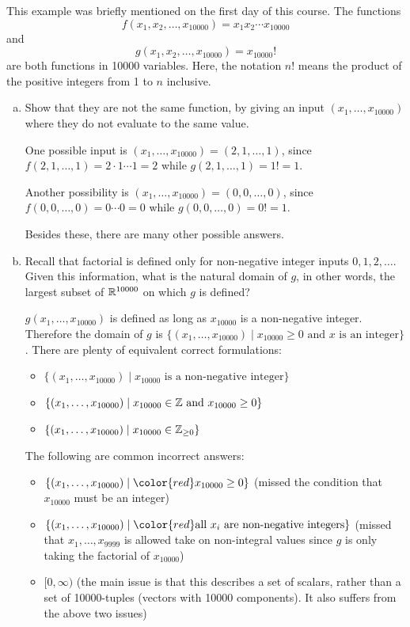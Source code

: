 \begin{problem}
  This example was briefly mentioned on the first day of this course. The functions
  \[f(x_1,x_2,\dots,x_{10000})=x_1x_2\cdots x_{10000}\]
  and
  \[g(x_1,x_2,\dots,x_{10000})=x_{10000}!\]
  are both functions in 10000 variables. Here, the notation $n!$ means the product of the positive integers from 1 to $n$ inclusive.
  \begin{enumerate}[(a)]
    \item Show that they are not the same function, by giving an input $(x_1,\dots,x_{10000})$ where they do not evaluate to the same value.
    \begin{solution}
      One possible input is $(x_1,\dots,x_{10000})=(2,1,\dots,1)$, since $f(2,1,\dots,1)=2\cdot 1\cdots 1=2$ while $g(2,1,\dots,1)=1!=1$.

      Another possibility is $(x_1,\dots,x_{10000})=(0,0,\dots,0)$, since $f(0,0,\dots,0)=0\cdots 0=0$ while $g(0,0,\dots,0)=0!=1$.

      Besides these, there are many other possible answers.
    \end{solution}
    \item Recall that factorial is defined only for non-negative integer inputs $0,1,2,\dots$. Given this information, what is the natural domain of $g$, in other words, the largest subset of $\mathbb R^{10000}$ on which $g$ is defined?
    \begin{solution}
      $g(x_1,\dots,x_{10000})$ is defined as long as $x_{10000}$ is a non-negative integer. Therefore the domain of $g$ is $\{(x_1,\dots,x_{10000})\mid x_{10000}\geq 0\text{ and }x\text{ is an integer}\}$. There are plenty of equivalent correct formulations:
      \begin{itemize}
        \item $\{(x_1,\dots,x_{10000})\mid x_{10000}\text{ is a non-negative integer}\}$
        \item $\{(x_1,\dots,x_{10000})\mid x_{10000}\in\mathbb Z\text{ and }x_{10000}\geq 0\}$
        \item $\{(x_1,\dots,x_{10000})\mid x_{10000}\in\mathbb Z_{\geq 0}\}$
      \end{itemize}
      The following are common incorrect answers:
      \begin{itemize}
        \item $\{(x_1,\dots,x_{10000})\mid {\color{red}x_{10000}\geq 0}\}$ (missed the condition that $x_{10000}$ must be an integer)
        \item $\{(x_1,\dots,x_{10000})\mid {\color{red}\text{all }x_i\text{ are non-negative integers}}\}$ (missed that $x_1,\dots,x_{9999}$ is allowed take on non-integral values since $g$ is only taking the factorial of $x_{10000}$)
        \item {\color{red}$[0,\infty)$} (the main issue is that this describes a set of scalars, rather than a set of 10000-tuples (vectors with 10000 components). It also suffers from the above two issues)
      \end{itemize}


\end{solution}
\end{enumerate}
\end{problem}
